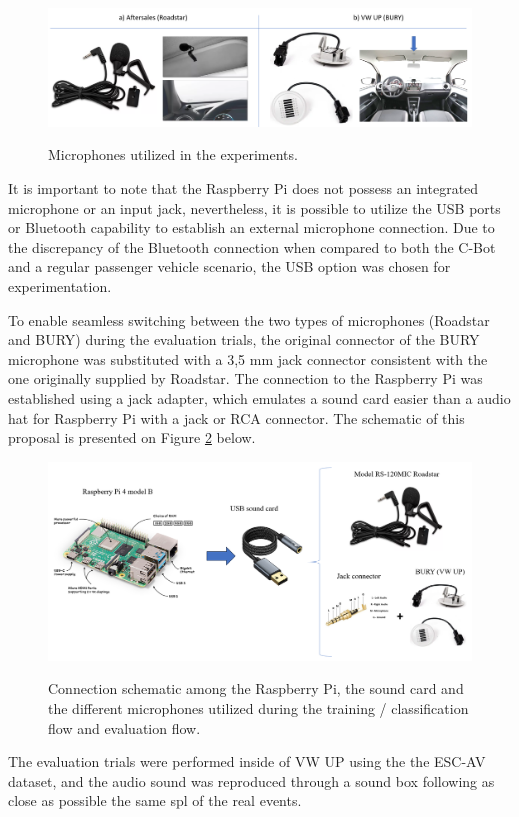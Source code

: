 \begin{figure}[htbp]
    \raggedright
        \caption{Microphones utilized in the experiments.}
        \includegraphics[width=1\textwidth]{resources/images/050-methods/Methods_evaluation_microphone_aftersales_VW_UP.png}
        \label{fig:methods_evaluation_microphone_aftersales_and_VW_UP}
\end{figure}

It is important to note that the Raspberry Pi does not possess an integrated microphone or an input jack, nevertheless, it is possible to utilize the USB ports or Bluetooth capability to establish an external microphone connection. Due to the discrepancy of the Bluetooth connection when compared to both the C-Bot and a regular passenger vehicle scenario, the USB option was chosen for experimentation.

To enable seamless switching between the two types of microphones (Roadstar and BURY) during the evaluation trials, the original connector of the BURY microphone was substituted with a 3,5 mm jack connector consistent with the one originally supplied by Roadstar. The connection to the Raspberry Pi was established using a jack adapter, which emulates a sound card easier than a audio hat for Raspberry Pi with a jack or RCA connector. The schematic of this proposal is presented on Figure \ref{fig:methods_evaluation_raspberry_pi} below.

\begin{figure}[htbp]
    \raggedright
        \caption{Connection schematic among the Raspberry Pi, the sound card and the different microphones utilized during the training / classification flow and evaluation flow.}
        \includegraphics[width=.9\textwidth]{resources/images/050-methods/Methods_evaluation_Raspberry_Pi_model_B.png}
        \label{fig:methods_evaluation_raspberry_pi}
\end{figure}

The evaluation trials were performed inside of VW UP using the the ESC-AV dataset, and the audio sound was reproduced through a sound box following as close as possible the same \gls{spl} of the real events.

